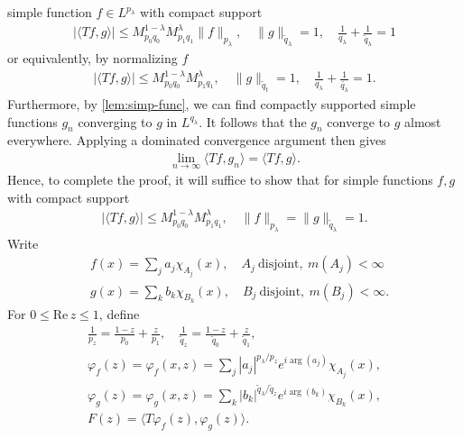 \documentclass[12pt,reqno]{amsart}
\numberwithin{equation}{section}  %
\numberwithin{figure}{section}
\newcommand{\vp}{\varphi}
\theoremstyle{plain}
\theoremstyle{definition}
\theoremstyle{remark}
\begin{document}
simple function $f \in L^{p_\lambda}$ with compact support
%
%
\begin{equation*}
\begin{split}
| \langle Tf, g \rangle |  \le M_{p_0q_0}^{1-\lambda}M_{p_1q_1}^{\lambda}
\|f\|_{p_\lambda},
\quad \|g\|_{\tilde{q}_{\lambda}} =1, \quad \frac{1}{q_{\lambda}} +
\frac{1}{\tilde{q}_{\lambda}} =1
\end{split}
\end{equation*}
%
%
or equivalently, by normalizing $f$
%
%
\begin{equation*}
\begin{split}
| \langle Tf, g \rangle |  \le M_{p_0q_0}^{1-\lambda}M_{p_1q_1}^{\lambda},
\quad \|g\|_{\tilde{q}_{t}} =1, \quad \frac{1}{q_{\lambda}} +
\frac{1}{\tilde{q_{\lambda}}} =1.
\end{split}
\end{equation*}
%
%
Furthermore, by \autoref{lem:simp-func}, we can find compactly supported simple
functions $g_n$ converging to $g$ in $L^{q_{\lambda}}$.
It follows that the $g_n$ converge to $g$ almost everywhere.
Applying a dominated convergence
argument then gives
%
%
\begin{equation*}
\begin{split}
\lim_{n \to \infty}  \langle Tf, g_n \rangle
= \langle Tf, g \rangle.
\end{split}
\end{equation*}
%
%
Hence, to complete the proof, it will suffice to show that for simple functions
$f, g$ with compact support
%
%
\begin{equation}
\label{duality-relation}
\begin{split}
|\langle Tf, g \rangle | \le M_{p_0 q_0}^{1- \lambda} M_{p_1 q_1}^{\lambda},
\quad \| f \|_{p_\lambda} = \| g \|_{\tilde{q}_\lambda} =1.
\end{split}
\end{equation}
%
%
Write
%
%
\begin{equation*}
\begin{split}
	& f(x) = \sum_j a_j \chi_{A_j}(x), \quad A_j \ \text{disjoint}, \ m(A_j) <
	\infty
	\\
	& g(x) = \sum_{k}b_{k} \chi_{B_k}(x), \quad B_j \ \text{disjoint}, \ m(B_j) <
	\infty.
\end{split}
\end{equation*}
%
%
For $0 \le \text{Re}\, z
\le 1$, define
%
%
\begin{gather*}
\frac{1}{p_z} = \frac{1-z}{p_0} + \frac{z}{p_1}
,\quad \frac{1}{\tilde{q}_z} =
\frac{1-z}{\tilde{q}_0} + \frac{z}{\tilde{q}_1},
\\
\vp_{f}(z) = \vp_{f}(x, z) = \sum_{j} | a_j |^{p_\lambda / p_z} e^{i
\arg(a_j)} \chi_{A_j}(x),
\\
\vp_{g}(z) = \vp_{g}(x, z) = \sum_{k} | b_k |^{\tilde{q}_\lambda / \tilde{q}_z} e^{i
\arg(b_k)} \chi_{B_k}(x),
\\
F(z) = \langle T\vp_{f}(z), \vp_{g}(z) \rangle.
\end{gather*}
\end{document}
